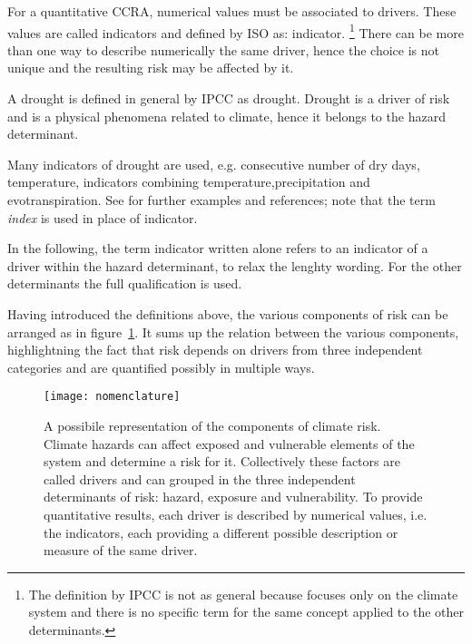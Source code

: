 For a quantitative \gls{CCRA}, numerical values must be associated to \glspl{driver}. These values are called \glspl{indicator} and defined by \gls{ISO} as: \glsdesc{indicator}.%
\footnote{The definition by \gls{IPCC} is not as general because focuses only on the climate system and there is no specific term for the same concept applied to the other \glspl{determinant}.}
There can be more than one way to describe numerically the same \gls{driver}, hence the choice is not unique and the resulting risk may be affected by it.
\begin{example}
  A \gls{drought} is defined in general by \gls{IPCC} as \glsdesc{drought}. Drought is a \gls{driver} of \gls{risk} and is a physical phenomena related to climate, hence it belongs to the \gls{hazard} \gls{determinant}.
  
  Many \glspl{indicator} of drought are used, e.g. consecutive number of dry days, temperature, indicators combining temperature,precipitation and evotranspiration. See \cite[167-169]{2012FieldManagingThe} for further examples and references; note that the term \emph{index} is used in place of indicator.
\end{example}
In the following, the term \gls{indicator} written alone refers to an \gls{indicator} of a \gls{driver} within the \gls{hazard} \gls{determinant}, to relax the lenghty wording. For the other \glspl{determinant} the full qualification is used.

Having introduced the definitions above, the various components of \gls{risk} can be arranged as in figure~\ref{fig:nomenclature}. It sums up the relation between the various components, highlightning the fact that risk depends on drivers from three independent categories and are quantified possibly in multiple ways.
\begin{figure}[h]
  \centering
  \texttt{[image: nomenclature]}
  \caption{A possibile representation of the components of climate risk. Climate hazards can affect exposed and vulnerable elements of the system and determine a risk for it. Collectively these factors are called drivers and can grouped in the three independent determinants of risk: hazard, exposure and vulnerability. To provide quantitative results, each driver is described by numerical values, i.e. the indicators, each providing a different possible description or measure of the same driver.}
  \label{fig:nomenclature}
\end{figure}



